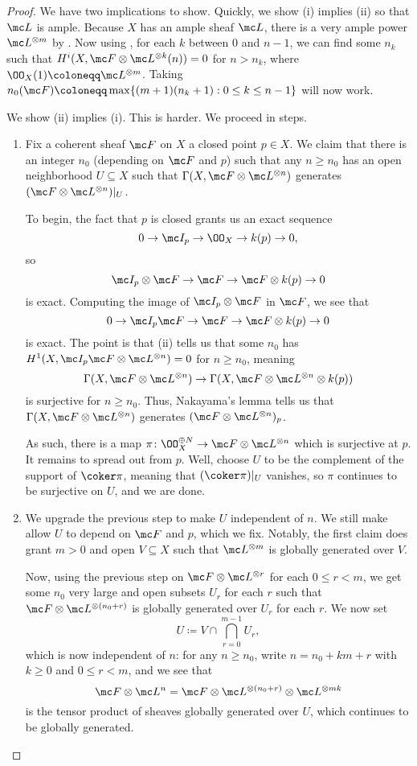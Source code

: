 \documentclass[../notes.tex]{subfiles}
\begin{document}
\begin{proof}
	We have two implications to show. Quickly, we show (i) implies (ii) so that $\mc L$ is ample. Because $X$ has an ample sheaf $\mc L$, there is a very ample power $\mc L^{\otimes m}$ by . Now using , for each $k$ between $0$ and $n-1$, we can find some $n_k$ such that $H^i(X,\mc F\otimes\mc L^{\otimes k}(n))=0$ for $n>n_k$, where $\OO_X(1)\coloneqq\mc L^{\otimes m}$. Taking $n_0(\mc F)\coloneqq\max\{(m+1)(n_k+1):0\le k\le n-1\}$ will now work.

	We show (ii) implies (i). This is harder. We proceed in steps.
	\begin{enumerate}
		\item Fix a coherent sheaf $\mc F$ on $X$ a closed point $p\in X$. We claim that there is an integer $n_0$ (depending on $\mc F$ and $p$) such that any $n\ge n_0$ has an open neighborhood $U\subseteq X$ such that $\Gamma(X,\mc F\otimes\mc L^{\otimes n})$ generates $(\mc F\otimes\mc L^{\otimes n})|_U$.

		To begin, the fact that $p$ is closed grants us an exact sequence
		\[0\to\mc I_p\to\OO_X\to k(p)\to0,\]
		so
		\[\mc I_p\otimes\mc F\to\mc F\to\mc F\otimes k(p)\to0\]
		is exact. Computing the image of $\mc I_p\otimes\mc F$ in $\mc F$, we see that
		\[0\to\mc I_p\mc F\to\mc F\to\mc F\otimes k(p)\to0\]
		is exact. The point is that (ii) tells us that some $n_0$ has $H^1(X,\mc I_p\mc F\otimes\mc L^{\otimes n})=0$ for $n\ge n_0$, meaning
		\[\Gamma(X,\mc F\otimes\mc L^{\otimes n})\to\Gamma(X,\mc F\otimes\mc L^{\otimes n}\otimes k(p))\]
		is surjective for $n\ge n_0$. Thus, Nakayama's lemma tells us that $\Gamma(X,\mc F\otimes\mc L^{\otimes n})$ generates $(\mc F\otimes\mc L^{\otimes n})_p$.
		
		As such, there is a map $\pi\colon\OO_X^{\oplus N}\to\mc F\otimes\mc L^{\otimes n}$ which is surjective at $p$. It remains to spread out from $p$. Well, choose $U$ to be the complement of the support of $\coker\pi$, meaning that $(\coker\pi)|_U$ vanishes, so $\pi$ continues to be surjective on $U$, and we are done.
		
		\item We upgrade the previous step to make $U$ independent of $n$. We still make allow $U$ to depend on $\mc F$ and $p$, which we fix. Notably, the first claim does grant $m>0$ and open $V\subseteq X$ such that $\mc L^{\otimes m}$ is globally generated over $V$.

		Now, using the previous step on $\mc F\otimes\mc L^{\otimes r}$ for each $0\le r<m$, we get some $n_0$ very large and open subsets $U_r$ for each $r$ such that $\mc F\otimes\mc L^{\otimes(n_0+r)}$ is globally generated over $U_r$ for each $r$. We now set
		\[U\coloneqq V\cap\bigcap_{r=0}^{m-1}U_r,\]
		which is now independent of $n$: for any $n\ge n_0$, write $n=n_0+km+r$ with $k\ge0$ and $0\le r<m$, and we see that
		\[\mc F\otimes\mc L^{n}=\mc F\otimes\mc L^{\otimes(n_0+r)}\otimes\mc L^{\otimes mk}\]
		is the tensor product of sheaves globally generated over $U$, which continues to be globally generated.


\end{enumerate}
\end{proof}
\end{document}
